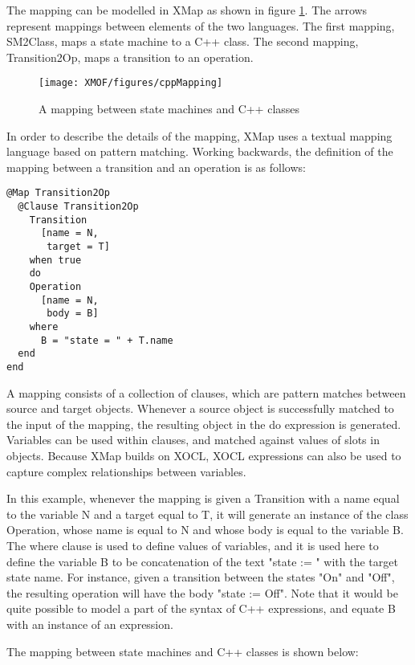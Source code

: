 The mapping can be modelled in XMap as shown in figure
\ref{mapping}.  The arrows represent mappings between elements of
the two languages. The first mapping, SM2Class, maps a state
machine to a C++ class. The second mapping, Transition2Op, maps a
transition to an operation.

\begin{figure}[htb]
\begin{center}
\texttt{[image: XMOF/figures/cppMapping]}
\caption{A mapping between state machines and C++ classes}
\label{mapping}
\end{center}
\end{figure}

In order to describe the details of the mapping, XMap uses a
textual  mapping language based on pattern matching. Working
backwards, the definition of the mapping between a transition and
an operation is as follows:

\small
\begin{verbatim}
@Map Transition2Op
  @Clause Transition2Op
    Transition
      [name = N,
       target = T]
    when true
    do
    Operation
      [name = N,
       body = B]
    where
      B = "state = " + T.name
  end
end
\end{verbatim}
\normalsize

A mapping consists of a collection of clauses, which are pattern
matches between source and target objects. Whenever a source object
is successfully matched to the input of the mapping, the resulting
object in the do expression is generated. Variables can be used
within clauses, and matched against values of slots in objects.
Because XMap builds on XOCL, XOCL expressions can also be used to
capture complex relationships between variables.

In this example, whenever the mapping is given a Transition with a
name equal to the variable N and a target equal to T, it will
generate an instance of the class Operation, whose name is equal
to N and whose body is equal to the variable B. The where clause
is used to define values of variables, and it is used here to
define the variable B to be concatenation of the text "state := "
with the target state name. For instance, given a transition
between the states "On" and "Off", the resulting operation will
have the body "state := Off". Note that it would be quite possible
to model a part of the syntax of {C++} expressions, and equate B
with an instance of an expression.

The mapping between state machines and {C++} classes is shown below:

